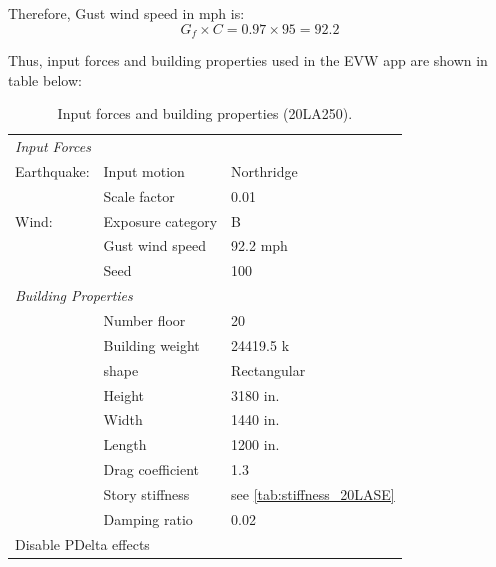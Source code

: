 \documentclass[onecolumn, fleqn]{article}
\begin{document}
Therefore, Gust wind speed in mph is:
\begin{equation*}
G_f \times C = 0.97 \times 95 = \boxed{92.2}
\end{equation*}

Thus, input forces and building properties used in the EVW app are shown in table below:

\begin{table}[H]
	\centering \caption{Input forces and building properties (20LA250).}
	\begin{tabular}{lll}
	\toprule
	\multicolumn{3}{l}{\textit{Input Forces}}					\\
	\cmidrule(rl){1-3}
	Earthquake:		& Input motion		& Northridge			\\
					& Scale factor		& 0.01					\\
	Wind:			& Exposure category	& B						\\
					& Gust wind speed	& 92.2 mph				\\
					& Seed				& 100					\\
	\midrule
	\multicolumn{3}{l}{\textit{Building Properties}}			\\
	\cmidrule(rl){1-3}
					& Number floor		& 20					\\
					& Building weight	& 24419.5 k				\\
					& shape				& Rectangular			\\
					& Height			& 3180 in.				\\
					& Width				& 1440 in.				\\
					& Length			& 1200 in.				\\
					& Drag coefficient	& 1.3					\\
					& Story stiffness	& see \cref{tab:stiffness_20LASE}			\\
					& Damping ratio		& 0.02					\\
	\midrule
	\multicolumn{3}{l}{Disable PDelta effects}					\\
	\bottomrule
	\end{tabular}
\end{table}
\end{document}
